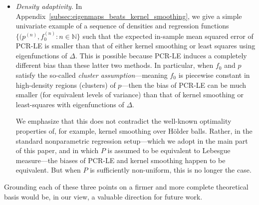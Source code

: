 \begin{itemize}
	\item \emph{Density adaptivity}. In Appendix~\ref{subsec:eigenmaps_beats_kernel_smoothing}, we give a simple univariate example of a sequence of densities and regression functions $\{(p^{(n)}, f_0^{(n)}: n \in \mathbb{N}\}$ such that the expected in-sample mean squared error of PCR-LE is smaller than that of either kernel smoothing or least squares using eigenfunctions of $\Delta$. This is possible because PCR-LE induces a completely different bias than these latter two methods. In particular, when $f_0$ and $p$ satisfy the so-called \emph{cluster assumption}---meaning $f_0$ is piecewise constant in high-density regions (clusters) of $p$---then the bias of PCR-LE can be much smaller (for equivalent levels of variance) than that of kernel smoothing or least-squares with eigenfunctions of $\Delta$. 
	
	We emphasize that this does not contradict the well-known optimality properties of, for example, kernel smoothing over H\"{o}lder balls. Rather, in the standard nonparametric regression setup---which we adopt in the main part of this paper, and in which $P$ is assumed to be equivalent to Lebesgue measure---the biases of PCR-LE and kernel smoothing happen to be equivalent. But when $P$ is sufficiently non-uniform, this is no longer the case.
\end{itemize}
Grounding each of these three points on a firmer and more complete theoretical basis would be, in our view, a valuable direction for future work.